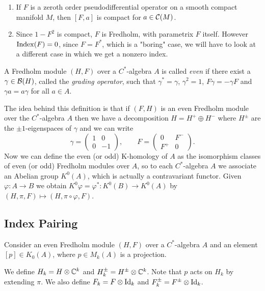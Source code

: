 \begin{remark}\noindent
 \begin{enumerate}
  \item If $F$ is a zeroth order pseudodifferential operator on a smooth compact manifold $M$, then $[F,a]$ is compact for $a\in\mathcal{C}(M)$. 
  \item Since $1-F^2$ is compact, $F$ is Fredholm, with parametrix $F$ itself. However $\mathrm{Index}(F)=0$, since $F=F^\ast$, which is a "boring" case, we will have to look at a different case in which we get a nonzero index. 
 \end{enumerate}
\end{remark}

\begin{definition}
A Fredholm module $(H,F)$ over a $C^\ast$-algebra $A$ is called \emph{even} if there exist a $\gamma\in\mathcal{B}(H)$, called the \emph{grading operator}, such that $\gamma^\ast=\gamma$, $\gamma^2=1$, $F\gamma=-\gamma F$ and $\gamma a=a\gamma$ for all $a\in A$.  
\end{definition}

\noindent The idea behind this definition is that if $(F,H)$ is an even Fredholm module over the $C^\ast$-algebra $A$ then we have a decomposition $H=H^+\oplus H^-$ where $H^{\pm}$ are the $\pm 1$-eigenspaces of $\gamma$ and we can write 
$$\gamma=\begin{pmatrix}1 & 0 \\ 0 & -1\end{pmatrix},\quad\quad F=\begin{pmatrix}0 & F^- \\ F^+ & 0\end{pmatrix}.$$
Now we can define the even (or odd) K-homology of $A$ as the isomorphism classes of even (or odd) Fredholm modules over $A$, so to each $C^\ast$-algebra $A$ we associate an Abelian group $K^0(A)$, which is actually a contravariant functor. Given $\varphi\colon A\to B$ we obtain $K^0\varphi=\varphi^\ast\colon K^0(B)\to K^0(A)$ by $(H,\pi,F)\mapsto (H,\pi\circ\varphi,F)$.

\subsection{Index Pairing}
Consider an even Fredholm module $(H,F)$ over a $C^\ast$-algebra $A$ and an element $[p]\in K_0(A)$, where $p\in M_k(A)$ is a projection.
\begin{definition}\label{defn: H_k}
 We define $H_k=H\otimes\mathbb{C}^k$ and $H_k^\pm=H^\pm\otimes\mathbb{C}^k$. Note that $p$ acts on $H_k$ by extending $\pi$. We also define $F_k=F\otimes\mathrm{Id}_k$ and $F_k^\pm=F^\pm\otimes\mathrm{Id}_k$.
\end{definition}

